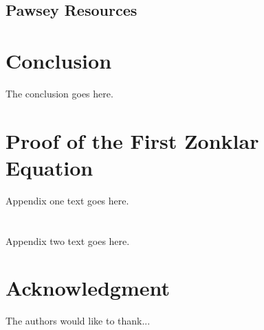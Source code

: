 \documentclass[journal]{IEEEtran}
\begin{document}
\subsection{Pawsey Resources}

\section{Conclusion}
The conclusion goes here.

\appendices
\section{Proof of the First Zonklar Equation}
Appendix one text goes here.

\section{}
Appendix two text goes here.

\section*{Acknowledgment}
The authors would like to thank...
\end{document}
